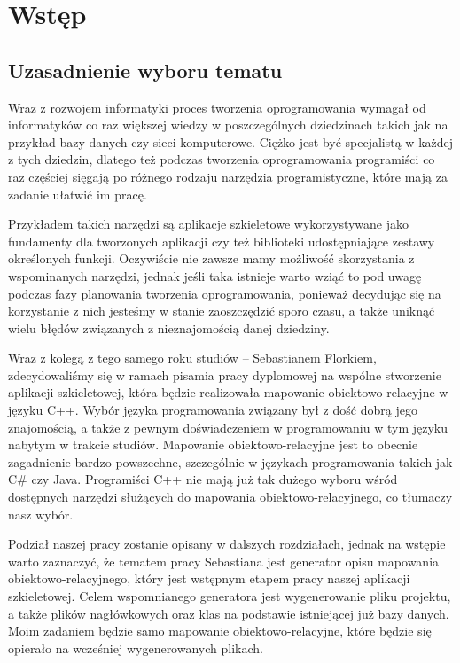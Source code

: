 \documentclass[12pt]{report}
\begin{document}


\tableofcontents

\chapter{Wstęp} \label{wstep}

\section{Uzasadnienie wyboru tematu}

Wraz z rozwojem informatyki proces tworzenia oprogramowania wymagał od informatyków co raz większej wiedzy w poszczególnych dziedzinach takich jak na przykład bazy 
danych czy sieci komputerowe. Ciężko jest być specjalistą w każdej z tych dziedzin, dlatego też podczas tworzenia oprogramowania programiści co raz częściej sięgają po
różnego rodzaju narzędzia programistyczne, które mają za zadanie ułatwić im pracę. 

Przykładem takich narzędzi są aplikacje szkieletowe wykorzystywane jako fundamenty dla tworzonych aplikacji czy też biblioteki udostępniające zestawy określonych funkcji. 
Oczywiście nie zawsze mamy możliwość skorzystania z wspominanych narzędzi, jednak jeśli taka istnieje warto wziąć to pod uwagę podczas fazy planowania tworzenia 
oprogramowania, ponieważ decydując się na korzystanie z nich jesteśmy w stanie zaoszczędzić sporo czasu, a także uniknąć wielu błędów związanych z nieznajomością danej
dziedziny.

Wraz z kolegą z tego samego roku studiów -- Sebastianem Florkiem, zdecydowaliśmy się w ramach pisamia pracy dyplomowej na wspólne stworzenie aplikacji szkieletowej, 
która będzie realizowała mapowanie obiektowo-relacyjne w języku C++. Wybór języka programowania związany był z dość dobrą jego znajomością, a także z pewnym
doświadczeniem w programowaniu w tym języku nabytym w trakcie studiów. Mapowanie obiektowo-relacyjne jest to obecnie zagadnienie bardzo powszechne, szczególnie w 
językach programowania takich jak C\# czy Java. Programiści C++ nie mają już tak dużego wyboru wśród dostępnych narzędzi służących do mapowania 
obiektowo-relacyjnego, co tłumaczy nasz wybór.

Podział naszej pracy zostanie opisany w dalszych rozdziałach, jednak na wstępie warto zaznaczyć, że tematem pracy Sebastiana jest generator opisu mapowania 
obiektowo-relacyjnego, który jest wstępnym etapem pracy naszej aplikacji szkieletowej. Celem wspomnianego generatora jest wygenerowanie pliku projektu, a także plików
nagłówkowych oraz klas na podstawie istniejącej już bazy danych. Moim zadaniem będzie samo mapowanie obiektowo-relacyjne, które będzie się opierało na wcześniej
wygenerowanych plikach. 
\end{document}
